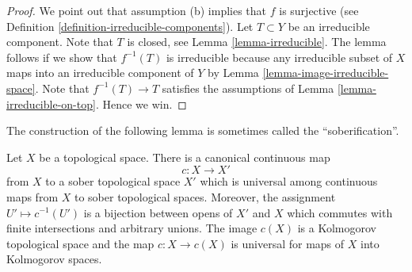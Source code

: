 \begin{proof}
We point out that assumption (b) implies that $f$ is surjective (see
Definition \ref{definition-irreducible-components}).
Let $T \subset Y$ be an irreducible component.
Note that $T$ is closed, see Lemma \ref{lemma-irreducible}.
The lemma follows if we show that $f^{-1}(T)$ is irreducible
because any irreducible subset of $X$ maps into an irreducible component
of $Y$ by Lemma \ref{lemma-image-irreducible-space}.
Note that $f^{-1}(T) \to T$ satisfies the assumptions
of Lemma \ref{lemma-irreducible-on-top}. Hence we win.
\end{proof}

\noindent
The construction of the following lemma is sometimes called
the ``soberification''.

\begin{lemma}
\label{lemma-make-sober}
Let $X$ be a topological space. There is a canonical continuous map
$$
c : X \longrightarrow X'
$$
from $X$ to a sober topological space $X'$ which is universal
among continuous maps from $X$ to sober topological spaces.
Moreover, the assignment $U' \mapsto c^{-1}(U')$ is a bijection
between opens of $X'$ and $X$ which commutes with finite intersections
and arbitrary unions.
The image $c(X)$ is a Kolmogorov topological space and the
map $c : X \to c(X)$ is universal for maps of $X$ into Kolmogorov spaces.
\end{lemma}

